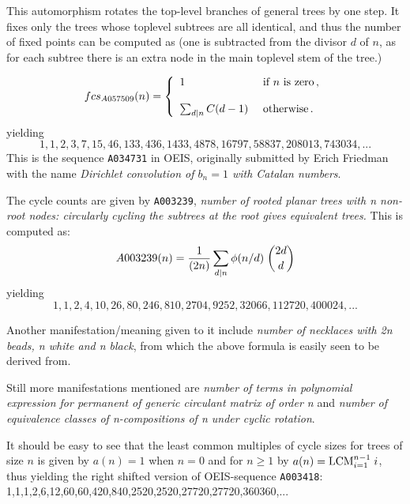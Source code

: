 \documentclass[11pt]{article} %
\newcommand{\eeq}{\end{equation}}
\newcommand{\beql}[1]{\begin{equation}\label{#1}}
\def\sratio#1#2{{#1/#2}}
\def\oratio#1#2{{#1\over #2}}
\newcommand{\EISseq}[1]{{\tt #1}}
\begin{document}


This automorphism rotates the top-level branches of general trees
by one step.
It fixes only the trees whose toplevel subtrees are all identical,
and thus the number of fixed points can be computed as
(one is subtracted from the divisor $d$ of $n$, as for each subtree
there is an extra node in the main toplevel stem of the tree.)

\beql{EQfc_A057509} %
\aligned
fcs_{A057509}(n) = \left\{ \begin{array}{lll}
1 & \mbox{~if~}n\mbox{~is~zero}\, , \\
\\
\sum_{d | n} C(d-1) & \mbox{~otherwise}\, . \\
\end{array} \right.
\endaligned
\eeq
yielding
$$
1,1,2,3,7,15,46,133,436,1433,4878,16797,58837,208013,743034,...
$$
This is the sequence \EISseq{A034731} in OEIS, originally submitted
by Erich Friedman with the name {\em Dirichlet convolution of $b_n=1$ with Catalan numbers}.

The cycle counts are given by \EISseq{A003239},
{\em number of rooted planar trees with n non-root nodes:
 circularly cycling the subtrees at the root gives equivalent trees.}
This is computed as:
\beql{Eqcc_A057509}
\aligned
A003239(n) = \oratio{1}{(2n)} \sum_{d | n}\phi(\sratio{n}{d})\;{2d\choose d}
\endaligned
\eeq
yielding
$$
1,1,2,4,10,26,80,246,810,2704,9252,32066,112720,400024,...
$$

Another manifestation/meaning given to it include
{\em number of necklaces with 2n beads, n white and n black},
from which the above formula is easily seen to be derived from.

Still more manifestations mentioned are
{\em number of terms in polynomial expression for permanent
of generic circulant matrix of order n}
and
{\em number of equivalence classes of n-compositions of n under cyclic rotation}.


It should be easy to see that the least common multiples of
cycle sizes for trees of size $n$ is given by $a(n)=1$ when $n=0$ and
for $n{\ge}1$ by $a(n)={\rm LCM}_{i=1}^{n-1}\;i$,
thus yielding the right shifted version of OEIS-sequence \EISseq{A003418}:
1,1,1,2,6,12,60,60,420,840,2520,2520,27720,27720,360360,...
\end{document}

